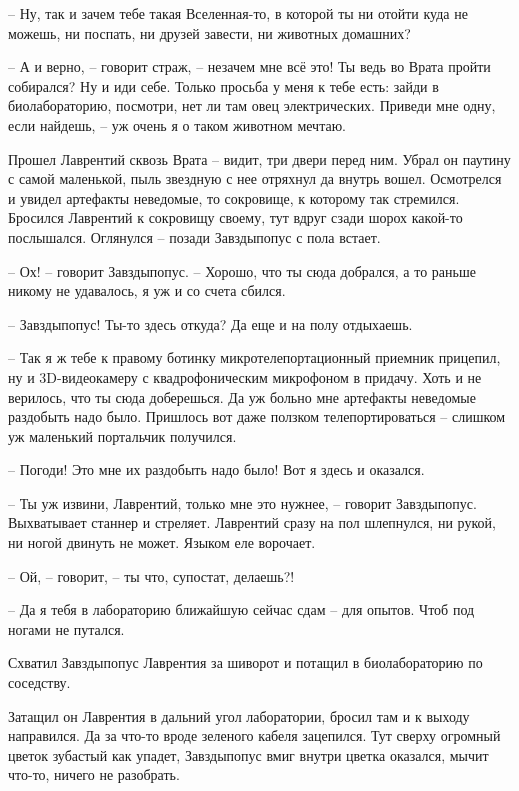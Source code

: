\documentclass[ebook,oneside,final,openright]{memoir}
\begin{document}
– Ну, так и зачем тебе такая Вселенная-то, в которой ты ни отойти куда не можешь, ни поспать, ни друзей завести, ни животных домашних? \par
– А и верно, – говорит страж, – незачем мне всё это! Ты ведь во Врата пройти собирался? Ну и иди себе. Только просьба у меня к тебе есть: зайди в биолабораторию, посмотри, нет ли там овец электрических. Приведи мне одну, если найдешь, – уж очень я о таком животном мечтаю.\par
\par
\par
Прошел Лаврентий сквозь Врата – видит, три двери перед ним. Убрал он паутину с самой маленькой, пыль звездную с нее отряхнул да внутрь вошел. Осмотрелся и увидел артефакты неведомые, то сокровище, к которому так стремился. Бросился Лаврентий к сокровищу своему, тут вдруг сзади шорох какой-то послышался. Оглянулся – позади Завздыпопус с пола встает.\par
– Ох! – говорит Завздыпопус. – Хорошо, что ты сюда добрался, а то раньше никому не удавалось, я уж и со счета сбился.\par
– Завздыпопус! Ты-то здесь откуда? Да еще и на полу отдыхаешь.\par
– Так я ж тебе к правому ботинку микротелепортационный приемник прицепил, ну и 3D-видеокамеру с квадрофоническим микрофоном в придачу. Хоть и не верилось, что ты сюда доберешься. Да уж больно мне артефакты неведомые раздобыть надо было. Пришлось вот даже ползком телепортироваться – слишком уж маленький портальчик получился.\par
– Погоди! Это мне их раздобыть надо было! Вот я здесь и оказался.\par
– Ты уж извини, Лаврентий, только мне это нужнее, – говорит Завздыпопус. Выхватывает станнер и стреляет. Лаврентий сразу на пол шлепнулся, ни рукой, ни ногой двинуть не может. Языком еле ворочает.\par
– Ой, – говорит, – ты что, супостат, делаешь?!\par
– Да я тебя в лабораторию ближайшую сейчас сдам – для опытов. Чтоб под ногами не путался.\par
Схватил Завздыпопус Лаврентия за шиворот и потащил в биолабораторию по соседству.\par
\par
Затащил он Лаврентия в дальний угол лаборатории, бросил там и к выходу направился. Да за что-то вроде зеленого кабеля зацепился. Тут сверху огромный цветок зубастый как упадет, Завздыпопус вмиг внутри цветка оказался, мычит что-то, ничего не разобрать.\par
\end{document}
